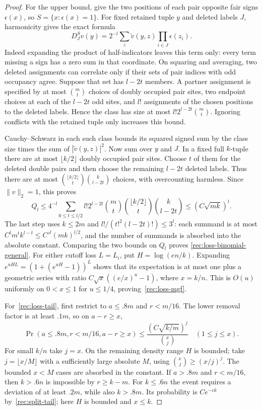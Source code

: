 \begin{proof}
For the upper bound, give the two positions of each pair opposite fair
signs $\epsilon(x)$, so $S=\{x:\epsilon(x)=1\}$.  For fixed retained
tuple $y$ and deleted labels $J$, harmonicity gives the exact formula
\[
 D_J^S v(y)=2^{-l}\sum_z\widetilde v(y,z)
                         \prod_{i\in J}\epsilon(z_i).
\]
Indeed expanding the product of half-indicators leaves this term only:
every term missing a sign has a zero sum in that coordinate.
On squaring and averaging, two deleted assignments can correlate only
if their sets of pair indices with odd occupancy agree.  Suppose that
set has $l-2t$ members.  A partner assignment is specified by at most
$\binom mt$ choices of doubly occupied pair sites, two endpoint
choices at each of the $l-2t$ odd sites, and $l!$ assignments of the
chosen positions to the deleted labels.  Hence the class has size at
most $l!2^{l-2t}\binom mt$.  Ignoring conflicts with the retained
tuple only increases this bound.

Cauchy--Schwarz in each such class bounds its squared signed sum by
the class size times the sum of $|\widetilde v(y,z)|^2$.  Now sum
over $y$ and $J$.  In a fixed full $k$-tuple there are at most
$\lfloor k/2\rfloor$ doubly occupied pair sites.  Choose $t$ of
them for the deleted double pairs and then choose the remaining
$l-2t$ deleted labels.  Thus there are at most
$\binom{\lfloor k/2\rfloor}{t}\binom{k}{l-2t}$ choices, with
overcounting harmless.  Since $\|v\|_2=1$, this proves
\begin{equation}\label{rec:removal-upper-sum}
 Q_l
 \le4^{-l}\sum_{0\le t\le l/2}
 l!2^{l-2t}{m\choose t}{\lfloor k/2\rfloor\choose t}{k\choose l-2t}
 \le(C\sqrt{mk})^l.
\end{equation}
The last step uses $k\le2m$ and
$l!/(t!^2(l-2t)!)\le3^l$: each summand is at most
$C^l m^t k^{l-t}\le C'^l(mk)^{l/2}$, and the number of summands
is absorbed into the absolute constant.  Comparing the two bounds on
$Q_l$ proves
\eqref{rec:loss-binomial-general}.  For either cutoff loss $L=L_i$, put
$H=\log(en/k)$.  Expanding
$e^{uHL}=(1+(e^{uH}-1))^L$ shows that its expectation is at most one
plus a geometric series with ratio
$C\sqrt{x}((e/x)^u-1)$, where $x=k/n$.  This is $O(u)$ uniformly on
$0<x\le1$ for $u\le1/4$, proving~\eqref{rec:loss-mgf}.

For~\eqref{rec:loss-tail}, first restrict to $a\le.8m$ and $r<m/16$.
The lower removal factor is at least $.1m$, so on $a-r\ge x$,
\[
 \Pr(a\le.8m,r<m/16,a-r\ge x)
 \le\frac{(C\sqrt{k/m})^j}{\binom{x}{j}}
 \quad(1\le j\le x).
\]
For small $k/n$ take $j=x$.  On the remaining density range $H$ is
bounded; take $j=\lfloor x/M\rfloor$ with a sufficiently large absolute
$M$, using ${x\choose j}\ge(x/j)^j$.  The bounded $x<M$ cases are
absorbed in the constant.  If $a>.8m$ and $r<m/16$, then $k>.6n$ is
impossible by $r\ge k-m$.  For $k\le.6n$ the event requires a deviation
of at least $.2m$, while also $k>.8m$.  Its probability is $Ce^{-ck}$
by~\eqref{rec:split-tail}; here $H$ is bounded and $x\le k$.
\end{proof}

